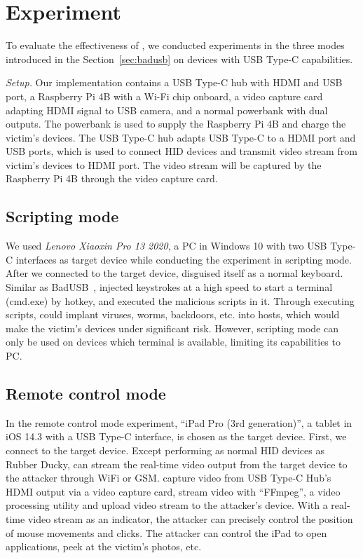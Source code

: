 \section{Experiment}
\label{sec:experiment}

To evaluate the effectiveness of \tool, we conducted experiments in the three modes introduced in the Section~\ref{sec:badusb} on devices with USB Type-C capabilities.

\textit{Setup.} Our implementation contains a USB Type-C hub with HDMI and USB port, a Raspberry Pi 4B with a Wi-Fi chip onboard, a video capture card adapting HDMI signal to USB camera, and a normal powerbank with dual outputs.
The powerbank is used to supply the Raspberry Pi 4B and charge the victim's devices.
The USB Type-C hub adapts USB Type-C to a HDMI port and USB ports, which is used to connect HID devices and transmit video stream from victim's devices to HDMI port. 
The video stream will be captured by the Raspberry Pi 4B through the video capture card.

\subsection{Scripting mode}

We used \textit{Lenovo Xiaoxin Pro 13 2020}, a PC in Windows 10 with two USB Type-C interfaces as target device while conducting the experiment in scripting mode. 
After we connected \tool to the target device, \tool disguised itself as a normal keyboard.
Similar as BadUSB~\cite{badusb}, \tool injected keystrokes at a high speed to start a terminal (cmd.exe) by hotkey, and executed the malicious scripts in it.
Through executing scripts, \tool could implant viruses, worms, backdoors, etc. into hosts, which would make the victim's devices under significant risk.
However, scripting mode can only be used on devices which terminal is available, limiting its capabilities to PC.

\subsection{Remote control mode}

In the remote control mode experiment, ``iPad Pro (3rd generation)'', a tablet in iOS 14.3 with a USB Type-C interface, is chosen as the target device. First, we connect \tool to the target device.
Except performing as normal HID devices as Rubber Ducky, \tool can stream the real-time video output from the target device to the attacker through WiFi or GSM.
\tool capture video from USB Type-C Hub's HDMI output via a video capture card, stream video with ``FFmpeg'', a video processing utility and upload video stream to the attacker's device.
With a real-time video stream as an indicator, the attacker can precisely control the position of mouse movements and clicks. The attacker can control the iPad to open applications, peek at the victim's photos, etc.

